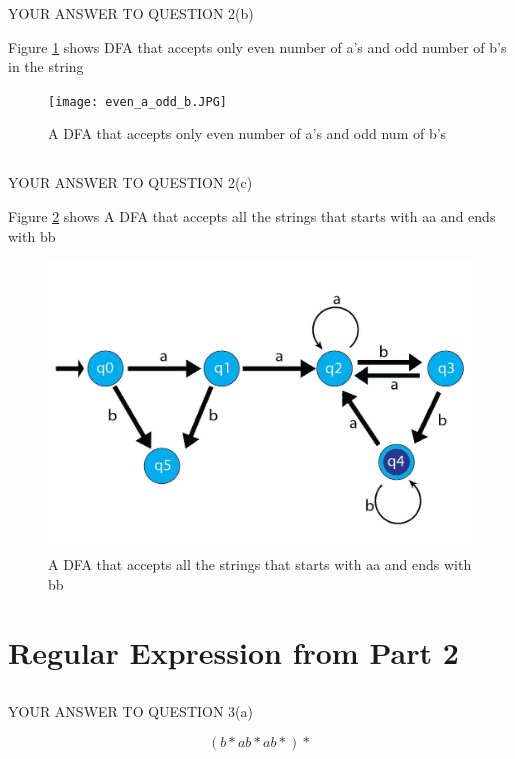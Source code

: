 \documentclass{article}
\begin{document}
YOUR ANSWER TO QUESTION 2(b)

Figure \ref{fig:even_a_odd_b} shows DFA that accepts only even number of a's and odd number of b's in the string
\begin{figure}
  \texttt{[image: even\_a\_odd\_b.JPG]}
  \caption{A DFA that accepts only even number of a's and odd num of b's}
  \label{fig:even_a_odd_b}
\end{figure}

\subsection{}

YOUR ANSWER TO QUESTION 2(c)


Figure \ref{fig:startswith_aa_endswith_bb} shows A DFA that accepts all the strings that starts with aa and ends with bb
\begin{figure}
  \includegraphics[width=\linewidth]{startswith_aa_endswith_bb.JPG}
  \caption{A DFA that accepts all the strings that starts with aa and ends with bb}
  \label{fig:startswith_aa_endswith_bb}
\end{figure}


\section{Regular Expression from Part 2} 

\subsection{}
YOUR ANSWER TO QUESTION 3(a)

\[(b*ab*ab*)*\]
\end{document}
